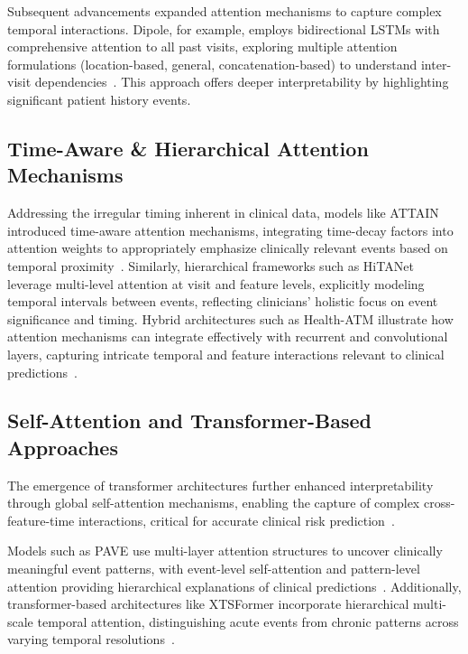 \documentclass[letterpaper]{article}
\begin{document}
\begin{enumerate}
Subsequent advancements expanded attention mechanisms to capture complex temporal interactions. Dipole, for example, employs bidirectional LSTMs with comprehensive attention to all past visits, exploring multiple attention formulations (location-based, general, concatenation-based) to understand inter-visit dependencies~\cite{ma2017dipole}. This approach offers deeper interpretability by highlighting significant patient history events.

\subsection{Time-Aware \& Hierarchical Attention Mechanisms}

Addressing the irregular timing inherent in clinical data, models like ATTAIN introduced time-aware attention mechanisms, integrating time-decay factors into attention weights to appropriately emphasize clinically relevant events based on temporal proximity~\cite{zhang2019attain}. Similarly, hierarchical frameworks such as HiTANet leverage multi-level attention at visit and feature levels, explicitly modeling temporal intervals between events, reflecting clinicians' holistic focus on event significance and timing. Hybrid architectures such as Health-ATM illustrate how attention mechanisms can integrate effectively with recurrent and convolutional layers, capturing intricate temporal and feature interactions relevant to clinical predictions~\cite{bai2018health}.

\subsection{Self-Attention and Transformer-Based Approaches}

The emergence of transformer architectures further enhanced interpretability through global self-attention mechanisms, enabling the capture of complex cross-feature-time interactions, critical for accurate clinical risk prediction~\cite{vaswani2017attention, li2020behrt}.

Models such as PAVE use multi-layer attention structures to uncover clinically meaningful event patterns, with event-level self-attention and pattern-level attention providing hierarchical explanations of clinical predictions~\cite{steinberg2021language}. Additionally, transformer-based architectures like XTSFormer incorporate hierarchical multi-scale temporal attention, distinguishing acute events from chronic patterns across varying temporal resolutions~\cite{zhang2024xtsformer}.


\end{enumerate}
\end{document}
